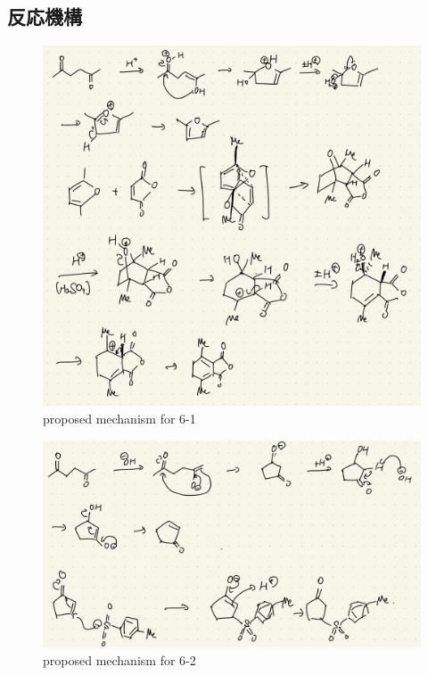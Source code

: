 \documentclass{ltjsarticle}
\theoremstyle{definition}
\numberwithin{equation}{section}
\begin{document}
\newpage
\subsection{反応機構}
\begin{figure}[htbp]
\begin{center}
\includegraphics[width = 15 cm]{mechanism_6-1.jpg}
\caption{proposed mechanism for 6-1}
\label{mechanism_6-1}
\end{center}
\end{figure}

\begin{figure}[htbp]
\begin{center}
\includegraphics[width = 15 cm]{mechanism_6-2.jpg}
\caption{proposed mechanism for 6-2}
\label{mechanism_6-2}
\end{center}
\end{figure}
\end{document}
